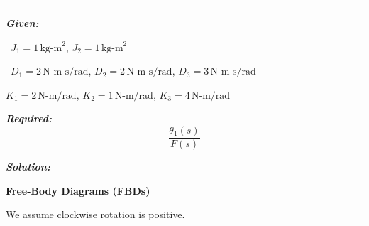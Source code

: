 \documentclass[11pt]{article}
\begin{document}
\noindent\rule{\textwidth}{1pt}

\vspace{12pt}

\noindent\textbf{\textit{Given:}}

\begin{center}
    
    \ $J_1 = 1 \, \text{kg-m}^2$, $J_2 = 1 \, \text{kg-m}^2$
    
    \ $D_1 = 2 \, \text{N-m-s/rad}$, $D_2 = 2 \, \text{N-m-s/rad}$, $D_{3} = 3 \, \text{N-m-s/rad}$
    
    \item $K_1 = 2 \, \text{N-m/rad}$, $K_2 = 1 \, \text{N-m/rad}$, $K_{3} = 4 \, \text{N-m/rad}$
\end{center}


\noindent\textbf{\textit{Required:}}
\[
\frac{\theta_1(s)}{F(s)}
\]


\noindent\textbf{\textit{Solution:}}

\vspace{12pt}

\noindent\textbf{Free-Body Diagrams (FBDs)}

\vspace{12pt}

We assume clockwise rotation is positive.
\end{document}
